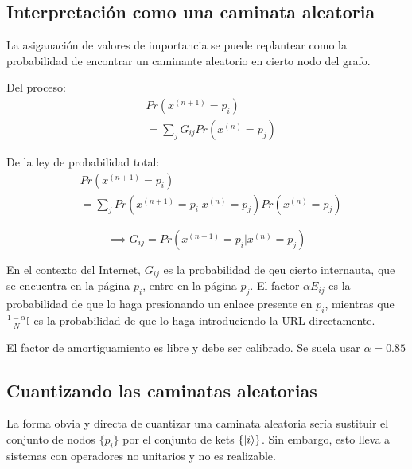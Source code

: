 \documentclass[11pt, spanish]{report}
\begin{document}
\subsection{Interpretación como una caminata aleatoria}

La asiganación de valores de importancia se puede replantear como la
probabilidad de encontrar un caminante aleatorio en cierto nodo del grafo.

\begin{minipage}{0.5\linewidth}
Del proceso:
\begin{align*}
& Pr(x^{(n+1)}=p_i) \\
& =\sum\limits_j G_{i j} Pr(x^{(n)}=p_j)
\end{align*}
\end{minipage}
\begin{minipage}{0.5\linewidth}
De la ley de probabilidad total:
\begin{align*}
& Pr(x^{(n+1)}=p_i) \\
& =\sum\limits_j Pr(x^{(n+1)}=p_i|x^{(n)}=p_j) Pr(x^{(n)}=p_j)
\end{align*}
\end{minipage}
\[
\implies G_{i j} = Pr(x^{(n+1)}=p_i | x^{(n)}=p_j)
\]

En el contexto del Internet, $G_{i j}$ es la probabilidad de qeu cierto
internauta, que se encuentra en la página $p_i$, entre en la página $p_j$. El
factor $\alpha E_{i j}$ es la probabilidad de que lo haga presionando un enlace presente en $p_i$, mientras que $\frac{1-\alpha}{N} \mathds{I}$ es la probabilidad
de que lo haga introduciendo la URL directamente.

El factor de amortiguamiento es libre y debe ser calibrado. Se suela usar
$\alpha = 0.85$

\subsection{Cuantizando las caminatas aleatorias}

La forma obvia y directa de cuantizar una caminata aleatoria sería sustituir el
conjunto de nodos $\{p_i\}$ por el conjunto de kets $\{\ket{i}\}$. Sin embargo,
esto lleva a sistemas con operadores no unitarios y no es realizable.
\end{document}
